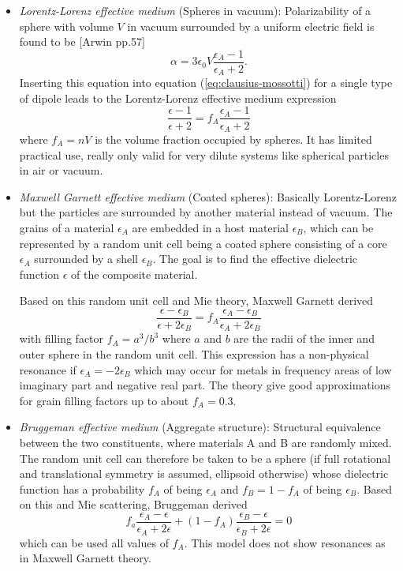 \begin{itemize}
    \item \emph{Lorentz-Lorenz effective medium} (Spheres in vacuum): Polarizability of a sphere with volume $V$ in vacuum surrounded by a uniform electric field is found to be [Arwin pp.57]
    \begin{equation}
        \alpha = 3\epsilon_0 V \frac{\epsilon_A - 1}{\epsilon_A + 2}.
    \end{equation}
    Inserting this equation into equation (\ref{eq:clausius-mossotti}) for a single type of dipole leads to the Lorentz-Lorenz effective medium expression
    \begin{equation}
        \frac{\epsilon - 1}{\epsilon + 2} = f_A \frac{\epsilon_A - 1}{\epsilon_A + 2}
    \end{equation}
    where $f_A=nV$ is the volume fraction occupied by spheres. It has limited practical use, really only valid for very dilute systems like spherical particles in air or vacuum.
    
    \item \emph{Maxwell Garnett effective medium} (Coated spheres): Basically Lorentz-Lorenz but the particles are surrounded by another material instead of vacuum. The grains of a material $\epsilon_A$ are embedded in a host material $\epsilon_B$, which can be represented by a random unit cell being a coated sphere consisting of a core $\epsilon_A$ surrounded by a shell $\epsilon_B$. The goal is to find the effective dielectric function $\epsilon$ of the composite material. 
    
    Based on this random unit cell and Mie theory, Maxwell Garnett derived
    \begin{equation}
        \frac{\epsilon - \epsilon_B}{\epsilon + 2\epsilon_B} = f_A \frac{\epsilon_A - \epsilon_B}{\epsilon_A + 2\epsilon_B}
    \end{equation}
    with filling factor $f_A = a^3/b^3$ where $a$ and $b$ are the radii of the inner and outer sphere in the random unit cell. This expression has a non-physical resonance if $\epsilon_A = -2\epsilon_B$ which may occur for metals in frequency areas of low imaginary part and negative real part. The theory give good approximations for grain filling factors up to about $f_A = 0.3$.
    
    \item \emph{Bruggeman effective medium} (Aggregate structure): Structural equivalence between the two constituents, where materials A and B are randomly mixed. The random unit cell can therefore be taken to be a sphere (if full rotational and translational symmetry is assumed, ellipsoid otherwise) whose dielectric function has a probability $f_A$ of being $\epsilon_A$ and $f_B = 1-f_A$ of being $\epsilon_B$. Based on this and Mie scattering, Bruggeman derived
    \begin{equation}
        f_a \frac{\epsilon_A - \epsilon}{\epsilon_A + 2\epsilon} + (1-f_A) \frac{\epsilon_B - \epsilon}{\epsilon_B + 2\epsilon} = 0
        \label{eq:bruggeman}
    \end{equation}
    which can be used  all values of $f_A$. This model does not show resonances as in Maxwell Garnett theory.
    

\end{itemize}

